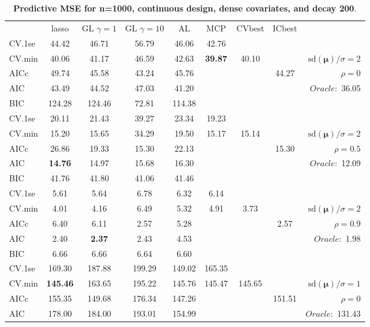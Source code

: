 \begin{table}\vspace{-.5cm}
\caption[l]{ { \bf Predictive MSE for n=1000, continuous design, 
dense covariates, and  decay  200}.}
\vspace{-.5cm}
\footnotesize{}
\begin{center}
\begin{tabular}{l*{7}{c}|r}
 & lasso & GL $\gamma=1$ & GL $\gamma=10$ & AL & MCP  & CVbest & ICbest  \\
\cline{1-9}
CV.1se & 44.42 & 46.71 & 56.79 & 46.06 & 42.76 & & & \\
CV.min & 40.06 & 41.17 & 46.59 & 42.63 & {\bf 39.87} & 40.10 & & $\mathrm{sd}(\mathbf{\mu})/\sigma=2$ \\
AICc & 49.74 & 45.58 & 43.24 & 45.76 & & & 44.27 &  $\rho=0$ \\
AIC & 43.49 & 44.52 & 47.03 & 41.20 & & & &  \multirow{2}{*}{$Oracle: $ 36.05} \\
BIC & 124.28 & 124.46 & 72.81 & 114.38 & & & &  \\
 \hline 
CV.1se & 20.11 & 21.43 & 39.27 & 23.34 & 19.23 & & & \\
CV.min & 15.20 & 15.65 & 34.29 & 19.50 & 15.17 & 15.14 & & $\mathrm{sd}(\mathbf{\mu})/\sigma=2$ \\
AICc & 26.86 & 19.33 & 15.30 & 22.13 & & & 15.30 &  $\rho=0.5$ \\
AIC & {\bf 14.76} & 14.97 & 15.68 & 16.30 & & & &  \multirow{2}{*}{$Oracle: $ 12.09} \\
BIC & 41.76 & 41.80 & 41.06 & 41.46 & & & &  \\
 \hline 
CV.1se & 5.61 & 5.64 & 6.78 & 6.32 & 6.14 & & & \\
CV.min & 4.01 & 4.16 & 6.49 & 5.32 & 4.91 & 3.73 & & $\mathrm{sd}(\mathbf{\mu})/\sigma=2$ \\
AICc & 6.40 & 6.11 & 2.57 & 5.28 & & & 2.57 &  $\rho=0.9$ \\
AIC & 2.40 & {\bf 2.37} & 2.43 & 4.53 & & & &  \multirow{2}{*}{$Oracle: $ 1.98} \\
BIC & 6.66 & 6.66 & 6.64 & 6.60 & & & &  \\
 \hline 
CV.1se & 169.30 & 187.88 & 199.29 & 149.02 & 165.35 & & & \\
CV.min & {\bf 145.46} & 163.65 & 195.22 & 145.76 & 145.47 & 145.65 & & $\mathrm{sd}(\mathbf{\mu})/\sigma=1$ \\
AICc & 155.35 & 149.68 & 176.34 & 147.26 & & & 151.51 &  $\rho=0$ \\
AIC & 178.00 & 184.00 & 193.01 & 154.99 & & & &  \multirow{2}{*}{$Oracle: $ 131.43} \\

\end{tabular}
\end{center}
\end{table}
